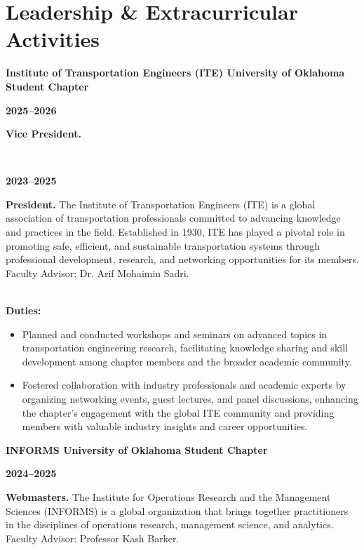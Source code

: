 \documentclass[a4paper,11pt]{article}
\begin{document}
\section{Leadership \& Extracurricular Activities}

\begin{flushleft}
\textcolor{mycolor}{\textbf{Institute of Transportation Engineers (ITE) University of Oklahoma Student Chapter}}\\
\parbox[t]{2.5cm}{\textbf{2025--2026}}%
\parbox[t]{\dimexpr\textwidth-2.5cm\relax}{%
\textbf{Vice President.}}\\[0.5em]
\parbox[t]{2.5cm}{\textbf{2023--2025}}%
\parbox[t]{\dimexpr\textwidth-2.5cm\relax}{%
\textbf{President.} The Institute of Transportation Engineers (ITE) is a global association of transportation professionals committed to advancing knowledge and practices in the field. Established in 1930, ITE has played a pivotal role in promoting safe, efficient, and sustainable transportation systems through professional development, research, and networking opportunities for its members.\\

Faculty Advisor: Dr. Arif Mohaimin Sadri.}\\

\textbf{Duties:}
\begin{itemize}
    \item Planned and conducted workshops and seminars on advanced topics in transportation engineering research, facilitating knowledge sharing and skill development among chapter members and the broader academic community.
    \item Fostered collaboration with industry professionals and academic experts by organizing networking events, guest lectures, and panel discussions, enhancing the chapter's engagement with the global ITE community and providing members with valuable industry insights and career opportunities.
\end{itemize}

\textcolor{mycolor}{\textbf{INFORMS University of Oklahoma Student Chapter}}\\
\parbox[t]{2.5cm}{\textbf{2024--2025}}%
\parbox[t]{\dimexpr\textwidth-2.5cm\relax}{%
\textbf{Webmasters.} The Institute for Operations Research and the Management Sciences (INFORMS) is a global organization that brings together practitioners in the disciplines of operations research, management science, and analytics.\\
Faculty Advisor: Professor Kash Barker.}\\


\end{flushleft}
\end{document}
